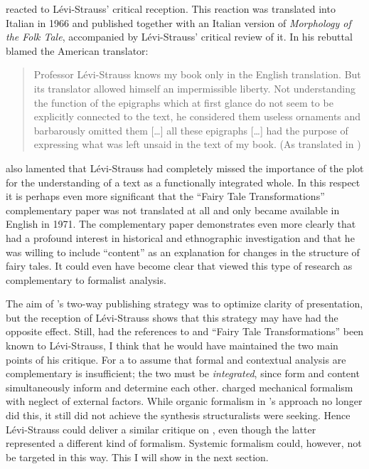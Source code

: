 \documentclass[output=paper]{langscibook}
\begin{document}
{\Propp} reacted to Lévi-Strauss' critical reception. This reaction was translated into Italian in 1966 and published together with an Italian version of \emph{Morphology of the Folk Tale}, accompanied by Lévi-Strauss' critical review of it. In his rebuttal {\Propp} blamed the American translator:

\begin{quotation}
Professor Lévi-Strauss knows my book only in the English translation. But its translator allowed himself an impermissible liberty. Not understanding the function of the epigraphs which at first glance do not seem to be explicitly connected to the text, he considered them useless ornaments and barbarously omitted them […] all these epigraphs […] had the purpose of expressing what was left unsaid in the text of my book. (As translated in \citealt[81]{Steiner1984})
\end{quotation}

{\Propp} also lamented that Lévi-Strauss had completely missed the importance of the plot for the understanding of a text as a functionally integrated whole. In this respect it is perhaps even more significant that the ``Fairy Tale Transformations'' complementary paper was not translated at all and only became available in English in 1971. The complementary paper demonstrates even more clearly that {\Propp} had a profound interest in historical and ethnographic investigation and that he was willing to include ``content'' as an explanation for changes in the structure of fairy tales. It could even have become clear that {\Propp} viewed this type of research as complementary to formalist analysis.

\largerpage
The aim of {\Propp}'s two-way publishing strategy was to optimize clarity of presentation, but the reception of Lévi-Strauss shows that this strategy may have had the opposite effect. Still, had the references to {\Goethe} and ``Fairy Tale Transformations'' been known to Lévi-Strauss, I think that he would have maintained the two main points of his critique. For a  to assume that formal and contextual analysis are complementary is insufficient; the two must be \emph{integrated}, since form and content simultaneously inform and determine each other. {\Mukarovsky} charged mechanical formalism with neglect of external factors. While organic formalism in {\Propp}'s approach no longer did this, it still did not achieve the synthesis structuralists were seeking. Hence Lévi-Strauss could deliver a similar critique on {\Propp}, even though the latter represented a different kind of formalism. Systemic formalism could, however, not be targeted in this way. This I will show in the next section.
\end{document}
